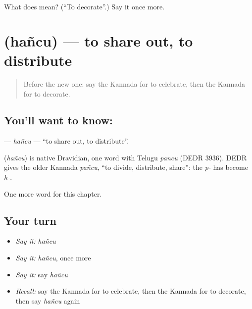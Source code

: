 \begin{tcolorbox}[breakable,colback=teal!4,colframe=teal!35!black,title={Before you move on}]
What does  mean? (\textquotedblleft{}To decorate\textquotedblright{}.) Say it once more.
\end{tcolorbox}
\section[\texorpdfstring{\kn{ಹಂಚು} (hañcu)}{ಹಂಚು (hañcu)}]{ (hañcu) — to share out, to distribute}

\label{lesson:KA-C239-hancu}



\begin{quote}
Before the new one: say the Kannada for to celebrate, then the Kannada for to decorate.
\end{quote}

\subsection*{You'll want to know: }
\textbf{} — \emph{hañcu} — \textquotedblleft{}to share out, to distribute\textquotedblright{}.

\begin{cousinweb}
\textbf{} (\emph{hañcu}) is native Dravidian, one word with Telugu \emph{pancu} (DEDR 3936). DEDR gives the older Kannada \emph{pañcu}, \textquotedblleft{}to divide, distribute, share\textquotedblright{}: the \emph{p-} has become \emph{h-}.
\end{cousinweb}

\begin{grammarlens}[title={What you've built}]
One more word for this chapter.
\end{grammarlens}

\subsection*{Your turn}
\begin{itemize}
\raggedright
  \item \emph{Say it:} \emph{hañcu}
  \item \emph{Say it:} \emph{hañcu}, once more
  \item \emph{Say it:} say \emph{hañcu}
  \item \emph{Recall:} say the Kannada for to celebrate, then the Kannada for to decorate, then say \emph{hañcu} again
\end{itemize}


